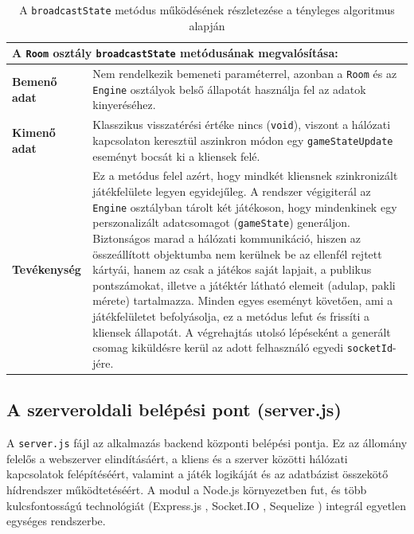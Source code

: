 \begin{table}[H]
    \centering
    \begin{tabular}{| p{} | p{} |}
        \hline
        \multicolumn{2}{|l|}{\textbf{A \texttt{Room} osztály \texttt{broadcastState} metódusának megvalósítása:}} \\
        \hline
        \textbf{Bemenő adat} & Nem rendelkezik bemeneti paraméterrel, azonban a \texttt{Room} és az \texttt{Engine} osztályok belső állapotát használja fel az adatok kinyeréséhez. \\
        \hline
        \textbf{Kimenő adat} & Klasszikus visszatérési értéke nincs (\texttt{void}), viszont a hálózati kapcsolaton keresztül aszinkron módon egy \texttt{gameStateUpdate} eseményt bocsát ki a kliensek felé. \\
        \hline
        \textbf{Tevékenység} & Ez a metódus felel azért, hogy mindkét kliensnek szinkronizált játékfelülete legyen egyidejűleg. A rendszer végigiterál az \texttt{Engine} osztályban tárolt két játékoson, hogy mindenkinek egy perszonalizált adatcsomagot (\texttt{gameState}) generáljon. Biztonságos marad a hálózati kommunikáció, hiszen az összeállított objektumba nem kerülnek be az ellenfél rejtett kártyái, hanem az csak a játékos saját lapjait, a publikus pontszámokat, illetve a játéktér látható elemeit (adulap, pakli mérete) tartalmazza. Minden egyes eseményt követően, ami a játékfelületet befolyásolja, ez a metódus lefut és frissíti a kliensek állapotát. A végrehajtás utolsó lépéseként a generált csomag kiküldésre kerül az adott felhasználó egyedi \texttt{socketId}-jére. \\
        \hline
    \end{tabular}
    \caption{A \texttt{broadcastState} metódus működésének részletezése a tényleges algoritmus alapján}
    \label{tab:actual_broadcaststate_spec}
\end{table}

\subsection{A szerveroldali belépési pont (server.js)}
\label{subsec:server_js}

A \texttt{server.js} fájl az alkalmazás backend központi belépési pontja. Ez az állomány felelős a webszerver elindításáért, a kliens és a szerver közötti hálózati kapcsolatok felépítéséért, valamint a játék logikáját és az adatbázist összekötő hídrendszer működtetéséért. A modul a Node.js környezetben fut, és több kulcsfontosságú technológiát (Express.js \cite{expressjs}, Socket.IO \cite{socketio}, Sequelize \cite{sequelize}) integrál egyetlen egységes rendszerbe.

